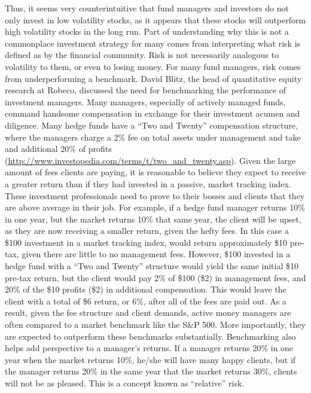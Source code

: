 \documentclass[12pt,twoside]{reedthesis}
\theoremstyle{definition}
\theoremstyle{definition}
\theoremstyle{definition}
\theoremstyle{remark}
\begin{document}
Thus, it seems very counterintuitive that fund managers and investors do
not only invest in low volatility stocks, as it appears that these
stocks will outperform high volatility stocks in the long run. Part of
understanding why this is not a commonplace investment strategy for many
comes from interpreting what risk is defined as by the financial
community. Risk is not necessarily analogous to volatility to them, or
even to losing money. For many fund managers, risk comes from
underperforming a benchmark. David Blitz, the head of quantitative
equity research at Robeco, discussed the need for benchmarking the
performance of investment managers. Many managers, especially of
actively managed funds, command handsome compensation in exchange for
their investment acumen and diligence. Many hedge funds have a ``Two and
Twenty'' compensation structure, where the managers charge a 2\% fee on
total assets under management and take and additional 20\% of profits
(\url{http://www.investopedia.com/terms/t/two_and_twenty.asp}). Given
the large amount of fees clients are paying, it is reasonable to believe
they expect to receive a greater return than if they had invested in a
passive, market tracking index. These investment professionals need to
prove to their bosses and clients that they are above average in their
job. For example, if a hedge fund manager returns 10\% in one year, but
the market returns 10\% that same year, the client will be upset, as
they are now receiving a smaller return, given the hefty fees. In this
case a \$100 investment in a market tracking index, would return
approximately \$10 pre-tax, given there are little to no management
fees. However, \$100 invested in a hedge fund with a ``Two and Twenty''
structure would yield the same initial \$10 pre-tax return, but the
client would pay 2\% of \$100 (\$2) in management fees, and 20\% of the
\$10 profits (\$2) in additional compensation. This would leave the
client with a total of \$6 return, or 6\%, after all of the fees are
paid out. As a result, given the fee structure and client demands,
active money managers are often compared to a market benchmark like the
S\&P 500. More importantly, they are expected to outperform these
benchmarks substantially. Benchmarking also helps add perspective to a
manager's returns. If a manager returns 20\% in one year when the market
returns 10\%, he/she will have many happy clients, but if the manager
returns 20\% in the same year that the market returns 30\%, clients will
not be as pleased. This is a concept known as ``relative'' risk.
\end{document}
